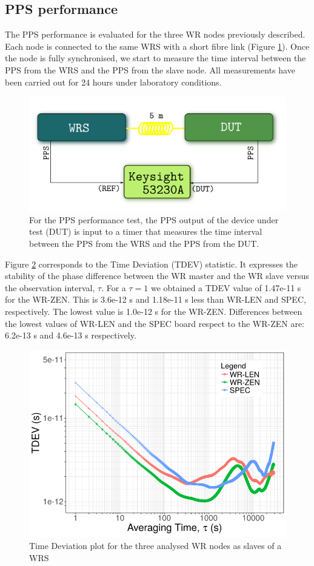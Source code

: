 \subsection{PPS performance}
\label{subsec:pps_performance}

The PPS performance is evaluated for the three WR nodes previously described. 
Each node is connected to the same WRS with a short fibre link (Figure 
\ref{fig:prueba1pps}). Once the node is fully synchronised, we start to 
measure the time interval between the PPS from the WRS and the PPS from the 
slave node. All measurements have been carried out for 24 hours under laboratory conditions.

\begin{figure}[H]
	\centering
	\includegraphics[width=0.7\linewidth]{img/prueba1_pps}
	\caption[Connection diagram for the PPS performance test.]{For the PPS 
	performance test, the PPS output of the device under test (DUT) is input to 
	a timer that measures the time interval between the PPS from the WRS and 
	the PPS from the DUT.}
	\label{fig:prueba1pps}
\end{figure}


Figure \ref{fig:tdev_exp1} corresponds to the Time Deviation (TDEV) statistic. 
It expresses the stability of the phase difference between the WR master and the 
WR slave versus the observation interval, $\tau$. For a $\tau=1$ we obtained a 
TDEV value of 1.47e-11 s for the WR-ZEN. This is 3.6e-12 s and 1.18e-11 s less than WR-LEN and SPEC, respectively. The lowest value is 1.0e-12 s for the WR-ZEN. Differences between the lowest values of WR-LEN and the SPEC board respect to the WR-ZEN are: 6.2e-13 s and 4.6e-13 s respectively.

\begin{figure}
    \centering
    \includegraphics[width=0.7\linewidth]{img/tdev_exp1}
    \caption[TDEV for the WR devices comparison.]{Time Deviation plot for the three analysed WR nodes as slaves of a WRS}
    \label{fig:tdev_exp1}
\end{figure}

